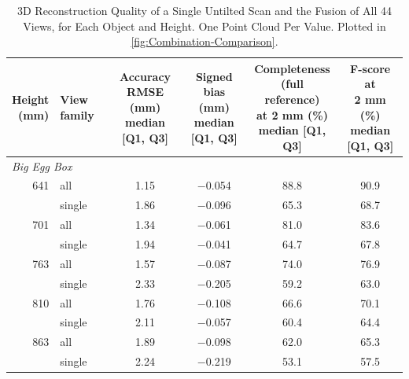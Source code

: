 \begin{table}[H]
	\centering
	\footnotesize
	\setlength{\tabcolsep}{4pt}
	\caption{3D Reconstruction Quality of a Single Untilted Scan and the Fusion of All 44 Views, for Each Object and Height. One Point Cloud Per Value. Plotted in \autoref{fig:Combination-Comparison}.}
	\label{tab:Combination_Comparison}
	\begin{tabular}{r l *{4}{c}}
		\toprule
		\makecell[r]{Height\\(mm)} & View family & \makecell{Accuracy\\RMSE (mm)\\{\scriptsize median [Q1, Q3]}} & \makecell{Signed\\bias (mm)\\{\scriptsize median [Q1, Q3]}} & \makecell{Completeness\\(full reference)\\at 2 mm (\%)\\{\scriptsize median [Q1, Q3]}} & \makecell{F-score at\\2 mm (\%)\\{\scriptsize median [Q1, Q3]}} \\
		\midrule
		\multicolumn{6}{l}{\textit{Big Egg Box}} \\
		641 & all & 1.15 & $-$0.054 & 88.8 & 90.9 \\
		 & single & 1.86 & $-$0.096 & 65.3 & 68.7 \\
		701 & all & 1.34 & $-$0.061 & 81.0 & 83.6 \\
		 & single & 1.94 & $-$0.041 & 64.7 & 67.8 \\
		763 & all & 1.57 & $-$0.087 & 74.0 & 76.9 \\
		 & single & 2.33 & $-$0.205 & 59.2 & 63.0 \\
		810 & all & 1.76 & $-$0.108 & 66.6 & 70.1 \\
		 & single & 2.11 & $-$0.057 & 60.4 & 64.4 \\
		863 & all & 1.89 & $-$0.098 & 62.0 & 65.3 \\
		 & single & 2.24 & $-$0.219 & 53.1 & 57.5 \\

\end{tabular}
\end{table}

